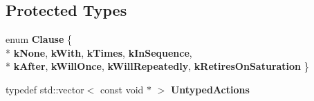 \subsection*{Protected Types}
\begin{DoxyCompactItemize}
\item 
enum {\bfseries Clause} \{ \\*
{\bfseries k\+None}, 
{\bfseries k\+With}, 
{\bfseries k\+Times}, 
{\bfseries k\+In\+Sequence}, 
\\*
{\bfseries k\+After}, 
{\bfseries k\+Will\+Once}, 
{\bfseries k\+Will\+Repeatedly}, 
{\bfseries k\+Retires\+On\+Saturation}
 \}\hypertarget{classtesting_1_1internal_1_1ExpectationBase_a450f34b979ec5814c91d4eab6b78cfc2}{}\label{classtesting_1_1internal_1_1ExpectationBase_a450f34b979ec5814c91d4eab6b78cfc2}

\item 
typedef std\+::vector$<$ const void $\ast$ $>$ {\bfseries Untyped\+Actions}\hypertarget{classtesting_1_1internal_1_1ExpectationBase_a9b21e82059961b9f1198d3f5d518254f}{}\label{classtesting_1_1internal_1_1ExpectationBase_a9b21e82059961b9f1198d3f5d518254f}

\end{DoxyCompactItemize}
